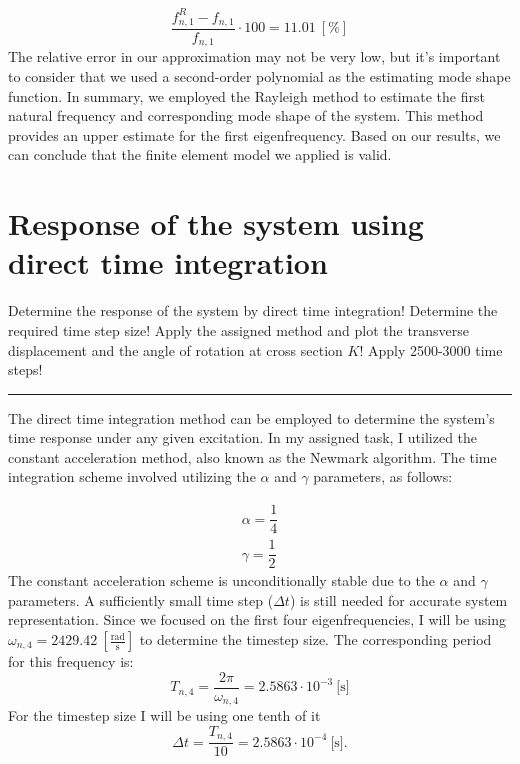 \documentclass[12pt]{article}
\newcommand{\horrule}[1]{\rule{\linewidth}{#1}}
\begin{document}
\begin{equation}
\dfrac{f_{n,1}^R - f_{n,1} }{f_{n,1}} \cdot 100 = 11.01 ~ [\%]
\end{equation}
The relative error in our approximation may not be very low, but it's important to consider that we used a second-order polynomial as the estimating mode shape function. In summary, we employed the Rayleigh method to estimate the first natural frequency and corresponding mode shape of the system. This method provides an upper estimate for the first eigenfrequency. Based on our results, we can conclude that the finite element model we applied is valid.


\section{Response of the system using direct time integration}
Determine the response of the system by direct time integration! Determine the required time step size! Apply the assigned method and plot the transverse displacement and the angle of rotation at cross section $K$! Apply 2500-3000 time steps!\\
\horrule{0.4pt}
The direct time integration method can be employed to determine the system's time response under any given excitation. In my assigned task, I utilized the constant acceleration method, also known as the Newmark algorithm. The time integration scheme involved utilizing the $\alpha$ and $\gamma$ parameters, as follows:

\begin{gather}
\alpha = \dfrac{1}{4} \\[0.1cm]
\gamma =  \dfrac{1}{2}
\end{gather}
The constant acceleration scheme is unconditionally stable due to the $\alpha$ and $\gamma$ parameters. A sufficiently small time step ($\Delta t$) is still needed for accurate system representation. Since we focused on the first four eigenfrequencies, I will be using $\omega_{n,4} = 2429.42 ~ \left[\frac{\text{rad}}{\text{s}}\right]$ to determine the timestep size. The corresponding period for this frequency is:
\begin{equation}
T_{n,4} = \dfrac{2 \pi}{\omega_{n,4}} = 2.5863 \cdot 10^{-3} ~ \text{[s]}
\end{equation}
For the timestep size I will be using one tenth of it 
\begin{equation}
\Delta t = \dfrac{T_{n,4}}{10} = 2.5863 \cdot 10^{-4} ~ \text{[s]}.
\end{equation}
\end{document}
